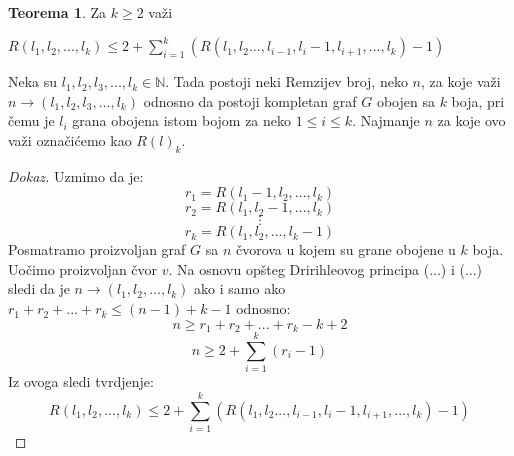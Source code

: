 \documentclass{article}
\theoremstyle{definition}
\newtheorem{teorema}{Teorema}[section]
\newcommand{\dokaz}[1]{\begin{proof}[Dokaz]#1\end{proof}}
\begin{document}
	\begin{teorema}
Za $k \geq 2$ važi 

$ R(l_1, l_2, ... , l_k) \leq 2 + \sum\limits_{i=1}^{k}(R(l_1, l_2 ... , l_{i-1}, l_i-1, l_{i+1}, ... , l_k)-1) $
\end{teorema}


Neka su $l_1, l_2, l_3, ... , l_k \in \mathbb{N}$. Tada postoji neki Remzijev broj, neko $n$, za koje važi $n \rightarrow (l_1, l_2, l_3, ... , l_k)$ odnosno da postoji kompletan graf $G$ obojen sa $k$ boja, pri čemu je $l_i$ grana obojena istom bojom za neko $1 \leq i \leq k$. Najmanje $n$ za koje ovo važi označićemo kao $R(l)_k$. 

\dokaz{
Uzmimo da je:
\[
r_1= R(l_1-1, l_2, ..., l_k)
\]
\[
r_2= R(l_1, l_2-1, ..., l_k)
\]
\[
\vdots
\]
\[
r_k= R(l_1, l_2, ..., l_k-1)
\]
Posmatramo proizvoljan graf $G$ sa $n$ čvorova u kojem su grane obojene u $k$ boja.
Uočimo proizvoljan čvor $v$. Na osnovu opšteg Dririhleovog principa (...) i (...) sledi da je $n \rightarrow (l_1,l_2,...,l_k) $ ako i samo ako $r_1 + r_2 + ... + r_k \leq (n-1)+k-1 $ odnosno:
\[
n \geq r_1+ r_2 + ... + r_k-k+2
\]
\[
n \geq 2 + \sum\limits_{i=1}^{k}(r_i-1)
\]
Iz ovoga sledi tvrdjenje:
\[
R(l_1, l_2, ... , l_k) \leq 2 + \sum\limits_{i=1}^{k}(R(l_1, l_2 ... , l_{i-1}, l_i-1, l_{i+1}, ... , l_k)-1)
\]	

}
\end{document}
